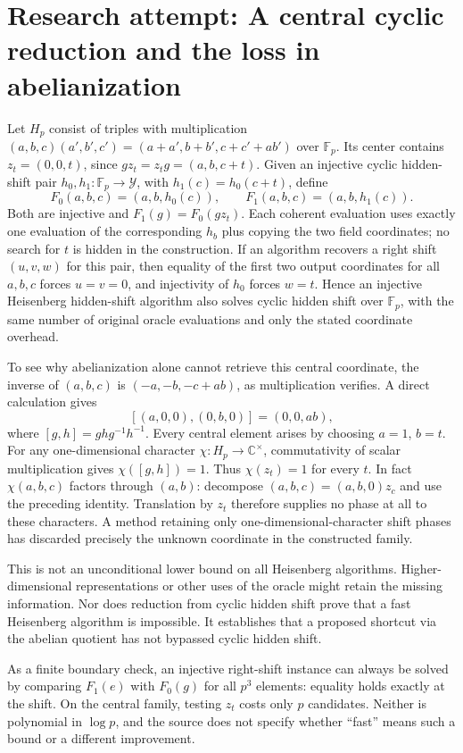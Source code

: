 \documentclass[11pt]{article}
\begin{document}
\section{Research attempt: A central cyclic reduction and the loss in abelianization}
Let $H_p$ consist of triples with multiplication $(a,b,c)(a',b',c')=(a+a',b+b',c+c'+ab')$ over $\mathbb F_p$. Its center contains $z_t=(0,0,t)$, since $gz_t=z_tg=(a,b,c+t)$. Given an injective cyclic hidden-shift pair $h_0,h_1:\mathbb F_p\to\mathcal Y$, with $h_1(c)=h_0(c+t)$, define
\[
 F_0(a,b,c)=(a,b,h_0(c)),\qquad F_1(a,b,c)=(a,b,h_1(c)).
\]
Both are injective and $F_1(g)=F_0(gz_t)$. Each coherent evaluation uses exactly one evaluation of the corresponding $h_b$ plus copying the two field coordinates; no search for $t$ is hidden in the construction. If an algorithm recovers a right shift $(u,v,w)$ for this pair, then equality of the first two output coordinates for all $a,b,c$ forces $u=v=0$, and injectivity of $h_0$ forces $w=t$. Hence an injective Heisenberg hidden-shift algorithm also solves cyclic hidden shift over $\mathbb F_p$, with the same number of original oracle evaluations and only the stated coordinate overhead.

To see why abelianization alone cannot retrieve this central coordinate, the inverse of $(a,b,c)$ is $(-a,-b,-c+ab)$, as multiplication verifies. A direct calculation gives
\[
 [(a,0,0),(0,b,0)]=(0,0,ab),
\]
where $[g,h]=ghg^{-1}h^{-1}$. Every central element arises by choosing $a=1$, $b=t$. For any one-dimensional character $\chi:H_p\to\mathbb C^\times$, commutativity of scalar multiplication gives $\chi([g,h])=1$. Thus $\chi(z_t)=1$ for every $t$. In fact $\chi(a,b,c)$ factors through $(a,b)$: decompose $(a,b,c)=(a,b,0)z_c$ and use the preceding identity. Translation by $z_t$ therefore supplies no phase at all to these characters. A method retaining only one-dimensional-character shift phases has discarded precisely the unknown coordinate in the constructed family.

This is not an unconditional lower bound on all Heisenberg algorithms. Higher-dimensional representations or other uses of the oracle might retain the missing information. Nor does reduction from cyclic hidden shift prove that a fast Heisenberg algorithm is impossible. It establishes that a proposed shortcut via the abelian quotient has not bypassed cyclic hidden shift.

As a finite boundary check, an injective right-shift instance can always be solved by comparing $F_1(e)$ with $F_0(g)$ for all $p^3$ elements: equality holds exactly at the shift. On the central family, testing $z_t$ costs only $p$ candidates. Neither is polynomial in $\log p$, and the source does not specify whether ``fast'' means such a bound or a different improvement.
\end{document}
